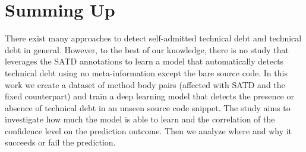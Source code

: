 \section{Summing Up}

There exist many approaches to detect self-admitted technical debt and technical debt in general. However, to the best of our knowledge, there is no study that leverages the SATD annotations to learn a model that automatically detects technical debt using no meta-information except the bare source code.
In this work we create a dataset of method body pairs (affected with SATD and the fixed counterpart) and train a deep learning model that detects the presence or absence of technical debt in an unseen source code snippet. The study aims to investigate how much the model is able to learn and the correlation of the confidence level on the prediction outcome. Then we analyze where and why it succeeds or fail the prediction.

